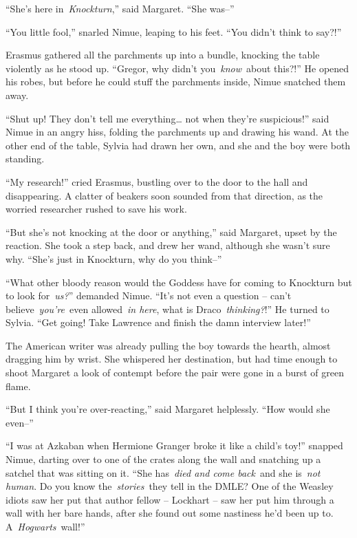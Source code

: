 ``She's here in~\emph{Knockturn},'' said Margaret. ``She was--''

``You little fool,'' snarled Nimue, leaping to his feet. ``You didn't
think to say?!''

Erasmus gathered all the parchments up into a bundle, knocking the table
violently as he stood up. ``Gregor, why didn't you~\emph{know}~about
this?!'' He opened his robes, but before he could stuff the parchments
inside, Nimue snatched them away.

``Shut up! They don't tell me everything\ldots{} not when they're
suspicious!'' said Nimue in an angry hiss, folding the parchments up and
drawing his wand. At the other end of the table, Sylvia had drawn her
own, and she and the boy were both standing.

``My research!'' cried Erasmus, bustling over to the door to the hall
and disappearing. A clatter of beakers soon sounded from that direction,
as the worried researcher rushed to save his work.

``But she's not knocking at the door or anything,'' said Margaret, upset
by the reaction. She took a step back, and drew her wand, although she
wasn't sure why. ``She's just in Knockturn, why do you think--''

``What other bloody reason would the Goddess have for coming to
Knockturn but to look for~\emph{us?}'' demanded Nimue. ``It's not even a
question -- can't believe~\emph{you're}~even allowed~\emph{in here},
what is Draco~\emph{thinking?}!'' He turned to Sylvia. ``Get going! Take
Lawrence and finish the damn interview later!''

The American writer was already pulling the boy towards the hearth,
almost dragging him by wrist. She whispered her destination, but had
time enough to shoot Margaret a look of contempt before the pair were
gone in a burst of green flame.

``But I think you're over-reacting,'' said Margaret helplessly. ``How
would she even--''

``I was at Azkaban when Hermione Granger broke it like a child's toy!''
snapped Nimue, darting over to one of the crates along the wall and
snatching up a satchel that was sitting on it. ``She has~\emph{died and
come back}~and she is~\emph{not human}. Do you know
the~\emph{stories}~they tell in the DMLE? One of the Weasley idiots saw
her put that author fellow -- Lockhart -- saw her put him through a wall
with her bare hands, after she found out some nastiness he'd been up to.
A~\emph{Hogwarts}~wall!''

